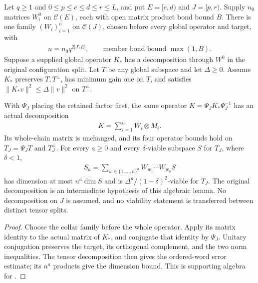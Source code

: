 \begin{lemma}
    \label{lem:common_collar_filter_words}
    \leanok
    Let $q\ge1$ and $0\le p\le c\le d\le r\le L$, and put
    $E=[c,d)$ and $J=[p,r)$. Supply $n_0$ matrices $W_i^0$ on
    $\mathcal C(E)$, each with open matrix product bond bound $B$.
    There is one family $(W_i)_{i=1}^n$ on $\mathcal C(J)$, chosen
    before every global operator and target, with
    \begin{align}
        n=n_0q^{2|J\setminus E|},
        \qquad \text{member bond bound }\max(1,B).
    \end{align}
    Suppose a supplied global operator $K_*$ has a decomposition through
    $W^0$ in the original configuration split. Let $T$ be any global
    subspace and let $\Delta\ge0$. Assume $K_*$ preserves $T,T^\perp$,
    has minimum gain one on $T$, and satisfies
    $\|K_*v\|^2\le\Delta\|v\|^2$ on $T^\perp$.

    With $\Psi_J$ placing the retained factor first, the same operator
    $K=\Psi_JK_*\Psi_J^{-1}$ has an actual decomposition
    \begin{align}
        K=\sum_{i=1}^n W_i\otimes M_i.
    \end{align}
    Its whole-chain matrix is unchanged, and its four operator bounds
    hold on $T_J=\Psi_JT$ and $T_J^\perp$. For every $a\ge0$ and
    every $\delta$-viable subspace $S$ for $T_J$, where $\delta<1$,
    \begin{align}
        S_a=\sum_{w\in\{1,\ldots,n\}^a}W_{w_1}\cdots W_{w_a}S
    \end{align}
    has dimension at most $n^a\dim S$ and is
    $\Delta^a/(1-\delta)^2$-viable for $T_J$.
    The original decomposition is an intermediate hypothesis of this
    algebraic lemma. No decomposition on $J$ is assumed, and no
    viability statement is transferred between distinct tensor splits.
\end{lemma}
\begin{proof}\leanok
    Choose the collar family before the whole operator. Apply its
    matrix identity to the actual matrix of $K_*$, and conjugate that
    identity by $\Psi_J$. Unitary conjugation preserves the target,
    its orthogonal complement, and the two norm inequalities. The
    tensor decomposition then gives the ordered-word error estimate;
    its $n^a$ products give the dimension bound. This is supporting
    algebra for \cite[Proposition~5.7]{Arad2016RigorousRG}.
\end{proof}
